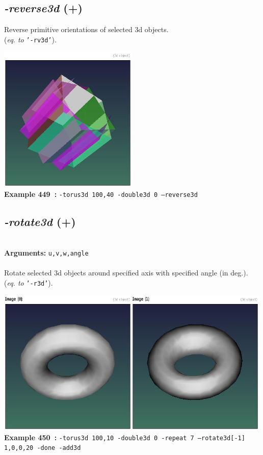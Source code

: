 \documentclass[a4paper,11pt,twoside]{book}
\begin{document}
\subsection{\emph{-reverse3d} (+)}\vspace*{-0.5em}
Reverse primitive orientations of selected 3d objects.
~\\(\emph{eq. to} {\small \texttt{'-rv3d'}}).
\begin{center}\includegraphics[keepaspectratio=true,height=7cm,width=\textwidth]{img/gmic_def449.jpg}\\
{\footnotesize \textbf{Example 449~:} \texttt{-torus3d 100,40 -double3d 0 --reverse3d}}
\end{center}

\subsection{\emph{-rotate3d} (+)}\vspace*{-0.5em}
~\\\textbf{Arguments: } 
{\small \texttt{u,v,w,angle}}\\~\\
Rotate selected 3d objects around specified axis with specified angle (in deg.).
~\\(\emph{eq. to} {\small \texttt{'-r3d'}}).
\begin{center}\includegraphics[keepaspectratio=true,height=7cm,width=\textwidth]{img/gmic_def450.jpg}\\
{\footnotesize \textbf{Example 450~:} \texttt{-torus3d 100,10 -double3d 0 -repeat 7 --rotate3d[-1] 1,0,0,20 -done -add3d}}
\end{center}
\end{document}

